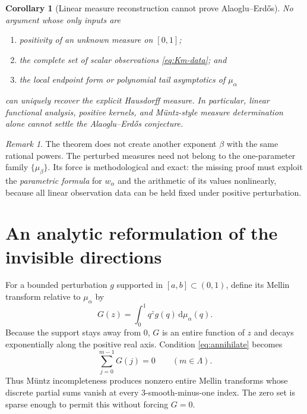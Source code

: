 \documentclass[11pt,oneside]{article}
\newtheorem{corollary}[theorem]{Corollary}
\theoremstyle{definition}
\theoremstyle{remark}
\newtheorem{remark}[theorem]{Remark}
\newcommand{\dd}{\,\mathrm d}
\newcommand{\AEname}{Alaoglu--Erd\H{o}s}
\begin{document}
\begin{corollary}[Linear measure reconstruction cannot prove \AEname{}]\label{cor:no-linear-proof}
No argument whose only inputs are
\begin{enumerate}[label=\textup{(\alph*)}]
\item positivity of an unknown measure on $[0,1]$;
\item the complete set of scalar observations \eqref{eq:Km-data}; and
\item the local endpoint form or polynomial tail asymptotics of $\mu_\alpha$
\end{enumerate}
can uniquely recover the explicit Hausdorff measure.  In particular, linear functional
analysis, positive kernels, and M\"untz-style measure determination alone cannot settle the
\AEname{} conjecture.
\end{corollary}

\begin{remark}
The theorem does not create another exponent $\beta$ with the same rational powers.  The
perturbed measures need not belong to the one-parameter family $\{\mu_\beta\}$.  Its force is
methodological and exact: the missing proof must exploit the \emph{parametric formula} for
$w_\alpha$ and the arithmetic of its values nonlinearly, because all linear observation data
can be held fixed under positive perturbation.
\end{remark}

\section{An analytic reformulation of the invisible directions}

For a bounded perturbation $g$ supported in $[a,b]\subset(0,1)$, define its Mellin transform
relative to $\mu_\alpha$ by
\begin{equation}\label{eq:G-def}
 G(z)=\int_0^1q^zg(q)\dd\mu_\alpha(q).
\end{equation}
Because the support stays away from $0$, $G$ is an entire function of $z$ and decays
exponentially along the positive real axis.  Condition \eqref{eq:annihilate} becomes
\begin{equation}\label{eq:partial-zero}
 \sum_{j=0}^{m-1}G(j)=0
 \qquad(m\in\Lambda).
\end{equation}
Thus M\"untz incompleteness produces nonzero entire Mellin transforms whose discrete partial
sums vanish at every $3$-smooth-minus-one index.  The zero set is sparse enough to permit this
without forcing $G=0$.
\end{document}

